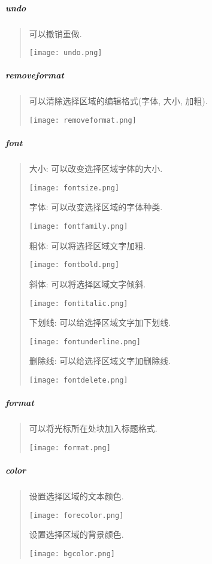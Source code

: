 \documentclass[letterpaper,10pt,english]{sphinxmanual}
\begin{document}
\subparagraph{undo}
\label{relatedproj/editorguide/plugin:undo}\begin{quote}

可以撤销重做.

\texttt{[image: undo.png]}
\end{quote}


\subparagraph{removeformat}
\label{relatedproj/editorguide/plugin:removeformat}\begin{quote}

可以清除选择区域的编辑格式(字体, 大小, 加粗).

\texttt{[image: removeformat.png]}
\end{quote}


\subparagraph{font}
\label{relatedproj/editorguide/plugin:font}\begin{quote}

大小: 可以改变选择区域字体的大小.

\texttt{[image: fontsize.png]}

字体: 可以改变选择区域的字体种类.

\texttt{[image: fontfamily.png]}

粗体: 可以将选择区域文字加粗.

\texttt{[image: fontbold.png]}

斜体: 可以将选择区域文字倾斜.

\texttt{[image: fontitalic.png]}

下划线: 可以给选择区域文字加下划线.

\texttt{[image: fontunderline.png]}

删除线: 可以给选择区域文字加删除线.

\texttt{[image: fontdelete.png]}
\end{quote}


\subparagraph{format}
\label{relatedproj/editorguide/plugin:format}\begin{quote}

可以将光标所在处块加入标题格式.

\texttt{[image: format.png]}
\end{quote}


\subparagraph{color}
\label{relatedproj/editorguide/plugin:color}\begin{quote}

设置选择区域的文本颜色.

\texttt{[image: forecolor.png]}

设置选择区域的背景颜色.

\texttt{[image: bgcolor.png]}
\end{quote}
\end{document}
